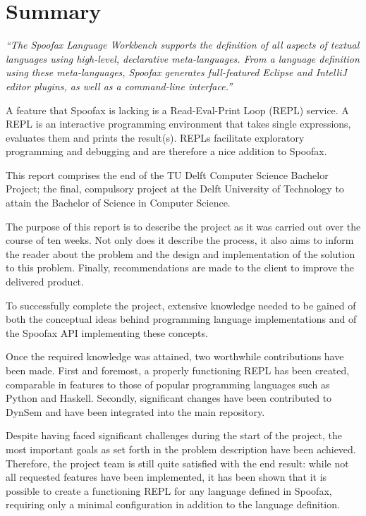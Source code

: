 \chapter{Summary}
\label{cha:summary}

\textit{``The Spoofax Language Workbench supports the definition of all aspects
of textual languages using high-level, declarative meta-languages. From a
language definition using these meta-languages, Spoofax generates full-featured
Eclipse and IntelliJ editor plugins, as well as a command-line interface.''}

A feature that Spoofax is lacking is a Read-Eval-Print Loop (REPL) service. A
REPL is an interactive programming environment that takes single expressions,
evaluates them and prints the result(s). REPLs facilitate exploratory
programming and debugging and are therefore a nice addition to Spoofax.

This report comprises the end of the TU Delft Computer Science Bachelor Project;
the final, compulsory project at the Delft University of Technology to attain
the Bachelor of Science in Computer Science.

The purpose of this report is to describe the project as it was carried out over
the course of ten weeks. Not only does it describe the process, it also aims to
inform the reader about the problem and the design and implementation of the
solution to this problem. Finally, recommendations are made to the client to
improve the delivered product.

To successfully complete the project, extensive knowledge needed to be gained of
both the conceptual ideas behind programming language implementations and of the
Spoofax API implementing these concepts.

Once the required knowledge was attained, two worthwhile contributions have been
made. First and foremost, a properly functioning REPL has been created,
comparable in features to those of popular programming languages such as Python
and Haskell. Secondly, significant changes have been contributed to DynSem and
have been integrated into the main repository.

Despite having faced significant challenges during the start of the project, the
most important goals as set forth in the problem description have been achieved.
Therefore, the project team is still quite satisfied with the end result: while
not all requested features have been implemented, it has been shown that it is
possible to create a functioning REPL for any language defined in Spoofax,
requiring only a minimal configuration in addition to the language definition.

